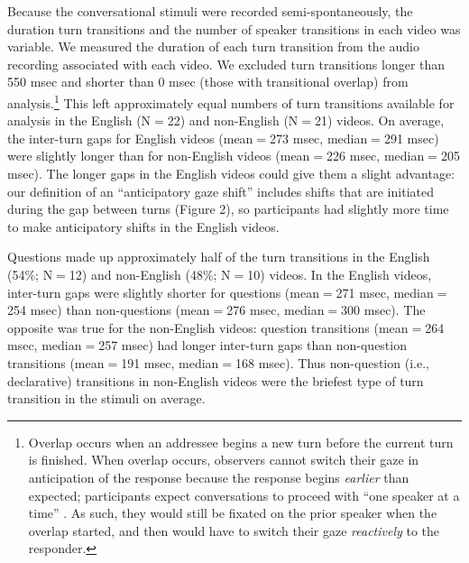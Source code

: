 \documentclass[authoryear, 12pt]{elsarticle}
\begin{document}
Because the conversational stimuli were recorded semi-spontaneously, the duration turn transitions and the number of speaker transitions in each video was variable. We measured the duration of each turn transition from the audio recording associated with each video. We excluded turn transitions longer than 550 msec and shorter than 0 msec (those with transitional overlap) from analysis.\footnote{Overlap occurs when an addressee begins a new turn before the current turn is finished. When overlap occurs, observers cannot switch their gaze in anticipation of the response because the response begins \textit{earlier} than expected; participants expect conversations to proceed with ``one speaker at a time'' \citep{sacks1974}. As such, they would still be fixated on the prior speaker when the overlap started, and then would have to switch their gaze \textit{reactively} to the responder.} This left approximately equal numbers of turn transitions available for analysis in the English (N$=$22) and non-English (N$=$21) videos. On average, the inter-turn gaps for English videos (mean$=$273 msec, median$=$291 msec) were slightly longer than for non-English videos (mean$=$226 msec, median$=$205 msec). The longer gaps in the English videos could give them a slight advantage: our definition of an ``anticipatory gaze shift'' includes shifts that are initiated during the gap between turns (Figure 2), so participants had slightly more time to make anticipatory shifts in the English videos.

Questions made up approximately half of the turn transitions in the English (54\%; N$=$12) and non-English (48\%; N$=$10) videos. In the English videos, inter-turn gaps were slightly shorter for questions (mean$=$271 msec, median$=$254 msec) than non-questions (mean$=$276 msec, median$=$300 msec). The opposite was true for the non-English videos: question transitions (mean$=$264 msec, median$=$257 msec) had longer inter-turn gaps than non-question transitions (mean$=$191 msec, median$=$168 msec). Thus non-question (i.e., declarative) transitions in non-English videos were the briefest type of turn transition in the stimuli on average.
\end{document}

